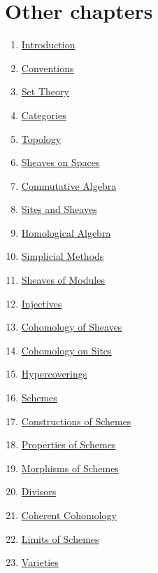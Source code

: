 \section{Other chapters}

\begin{multicols}{2}
\begin{enumerate}
\item \hyperref[introduction-section-phantom]{Introduction}
\item \hyperref[conventions-section-phantom]{Conventions}
\item \hyperref[sets-section-phantom]{Set Theory}
\item \hyperref[categories-section-phantom]{Categories}
\item \hyperref[topology-section-phantom]{Topology}
\item \hyperref[sheaves-section-phantom]{Sheaves on Spaces}
\item \hyperref[algebra-section-phantom]{Commutative Algebra}
\item \hyperref[sites-section-phantom]{Sites and Sheaves}
\item \hyperref[homology-section-phantom]{Homological Algebra}
\item \hyperref[simplicial-section-phantom]{Simplicial Methods}
\item \hyperref[modules-section-phantom]{Sheaves of Modules}
\item \hyperref[injectives-section-phantom]{Injectives}
\item \hyperref[cohomology-section-phantom]{Cohomology of Sheaves}
\item \hyperref[sites-cohomology-section-phantom]{Cohomology on Sites}
\item \hyperref[hypercovering-section-phantom]{Hypercoverings}
\item \hyperref[schemes-section-phantom]{Schemes}
\item \hyperref[constructions-section-phantom]{Constructions of Schemes}
\item \hyperref[properties-section-phantom]{Properties of Schemes}
\item \hyperref[morphisms-section-phantom]{Morphisms of Schemes}
\item \hyperref[divisors-section-phantom]{Divisors}
\item \hyperref[coherent-section-phantom]{Coherent Cohomology}
\item \hyperref[limits-section-phantom]{Limits of Schemes}
\item \hyperref[varieties-section-phantom]{Varieties}

\end{enumerate}
\end{multicols}
